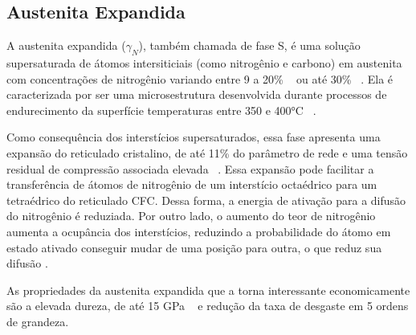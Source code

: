 \documentclass[]{politex}
\begin{document}
\subsection{Austenita Expandida}
	A austenita expandida ($\gamma_{N}$), também chamada de fase S,  é uma solução supersaturada de átomos intersiticiais (como nitrogênio e carbono) em austenita com concentrações de nitrogênio variando entre 9 a 20\%  ~\cite{williamson1994metastable} ou até 30\% ~\cite{moskalioviene2011modeling}. Ela é caracterizada por ser uma microsestrutura desenvolvida durante processos de endurecimento da superfície temperaturas entre 350 e 400°C ~\cite{mandl2003nitrogen}. \par
	Como consequência dos interstícios supersaturados, essa fase apresenta uma expansão do reticulado cristalino, de até 11\% do parâmetro de rede e uma tensão residual de compressão associada elevada ~\cite{somers2018expanded}. Essa expansão pode facilitar a transferência de átomos de nitrogênio de um interstício octaédrico para um tetraédrico do reticulado CFC. Dessa forma, a energia de ativação para a difusão do nitrogênio é reduziada. Por outro lado, o aumento do teor de nitrogênio aumenta a ocupância dos interstícios, reduzindo a probabilidade do átomo em estado ativado conseguir mudar de uma posição para outra, o que reduz sua difusão \cite{christiansen2008nitrogen}. \par
	As propriedades da austenita expandida que a torna interessante economicamente são a elevada dureza, de até 15 GPa ~\cite{mandl2003nitrogen} e redução da taxa de desgaste em 5 ordens de grandeza.
\end{document}
